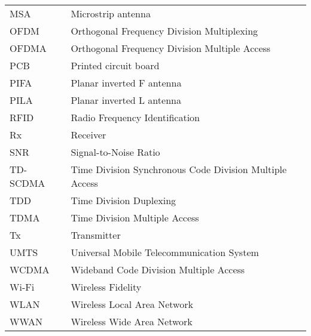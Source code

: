 \begin{tabular}{ll}
MSA         & Microstrip antenna\\
OFDM        & Orthogonal Frequency Division Multiplexing \\
OFDMA       & Orthogonal Frequency Division Multiple Access\\
PCB         & Printed circuit board\\
PIFA        & Planar inverted F antenna\\
PILA        & Planar inverted L antenna\\
RFID        & Radio Frequency Identification \\
Rx          & Receiver \\
SNR         & Signal-to-Noise Ratio \\
TD-SCDMA    & Time Division Synchronous Code Division Multiple Access \\
TDD         & Time Division Duplexing \\
TDMA        & Time Division Multiple Access \\
Tx          & Transmitter \\
UMTS        & Universal Mobile Telecommunication System \\
WCDMA       & Wideband Code Division Multiple Access \\
Wi-Fi       & Wireless Fidelity \\
WLAN        & Wireless Local Area Network \\
WWAN        & Wireless Wide Area Network\\
\end{tabular}
